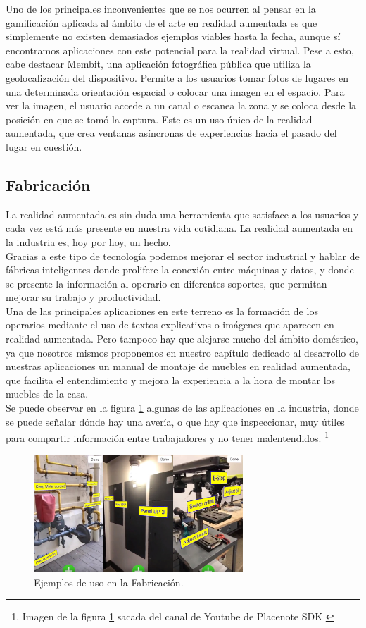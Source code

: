 Uno de los principales inconvenientes que se nos ocurren al pensar en la gamificación aplicada al ámbito de el arte en realidad aumentada es que simplemente no existen demasiados ejemplos viables hasta la fecha, aunque sí encontramos aplicaciones con este potencial para la realidad virtual.
Pese a esto, cabe destacar Membit\cite{MembitYT}, una aplicación fotográfica pública que utiliza la geolocalización del dispositivo. Permite a los usuarios tomar fotos de lugares en una determinada orientación espacial o colocar una imagen en el espacio. Para ver la imagen, el usuario accede a un canal o escanea la zona y se coloca desde la posición en que se tomó la captura. Este es un uso único de la realidad aumentada, que crea ventanas asíncronas de experiencias hacia el pasado del lugar en cuestión\cite{ARGames_Gamification}.

\subsection{Fabricación}
La realidad aumentada es sin duda una herramienta que satisface a los usuarios y cada vez está más presente en nuestra vida cotidiana. La realidad aumentada en la industria es, hoy por hoy, un hecho.\\
Gracias a este tipo de tecnología podemos mejorar el sector industrial y hablar de fábricas inteligentes donde prolifere la conexión entre máquinas y datos, y donde se presente la información al operario en diferentes soportes, que permitan mejorar su trabajo y productividad.\\ 
Una de las principales aplicaciones en este terreno es la formación de los operarios mediante el uso de textos explicativos o imágenes que aparecen en realidad aumentada. Pero tampoco hay que alejarse mucho del ámbito doméstico, ya que nosotros mismos proponemos en nuestro capítulo dedicado al desarrollo de nuestras aplicaciones un manual de montaje de muebles en realidad aumentada, que facilita el entendimiento y mejora la experiencia a la hora de montar los muebles de la casa.\\
Se puede observar en la figura \ref{fig:placenote} algunas de las aplicaciones en la industria, donde se puede señalar dónde hay una avería, o que hay que inspeccionar, muy útiles para compartir información entre trabajadores y no tener malentendidos.
{\let\thefootnote\relax\footnote{{Imagen de la figura \ref{fig:placenote} sacada del canal de Youtube de Placenote SDK \cite{PlacenoteYT}}}}
\begin{figure}[H]
     \centering
     \includegraphics[width=0.7\textwidth]{Images/Placenote.jpg}
     \caption{Ejemplos de uso en la Fabricación.}
     \label{fig:placenote}
 \end{figure}

